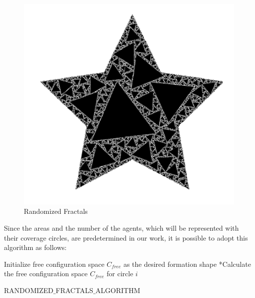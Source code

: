 \begin{figure}[H]
\caption{Randomized Fractals}
\centering
\includegraphics[scale = 0.70]{randomized}
\end{figure}
	
Since the areas and the number of the agents, which will be represented with their coverage circles, are predetermined in our work, it is possible to adopt this algorithm as follows:
		
\begin{algorithm}[H]
Initialize free configuration space $C_{free}$ as the desired formation shape \newline
{}
{		
*Calculate the free configuration space $C_{free}$ for circle $i$\;
}												
\caption{RANDOMIZED$\_$FRACTALS$\_$ALGORITHM} 
\end{algorithm}
		

	

